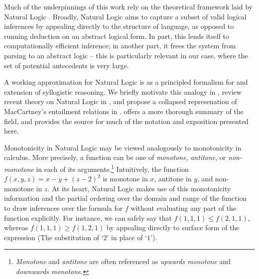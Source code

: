 Much of the underpinnings of this work rely on the theoretical framework
  laid by Natural Logic
  \cite{key:1986benthem-natlog,key:1991valencia-natlog}.
Broadly, Natural Logic aims to capture a subset of valid logical
  inferences by appealing directly to the structure of language,
  as opposed to running deduction on an abstract logical form.
In part, this lends itself to computationally efficient inference;
  in another part, it frees the system from parsing to an abstract
  logic -- this is particularly relevant in our case, where the set
  of potential antecedents is very large.

A working approximation for Natural Logic is as a principled formalism
  for and extension of syllogistic reasoning.
We briefly motivate this analogy in ,
  review recent theory on Natural Logic in
  , and propose a collapsed
  represenation of MacCartney's entailment relations in
  .
 offers a more thorough summary of the
  field, and provides the source for much of the notation and
  exposition presented here.

%
%


%
%
Monotonicity in Natural Logic may be viewed analogously to monotonicity
  in calculus.
More precisely, a function can be one of \textit{monotone},
  \textit{antitone}, or \textit{non-monotone} in each of its
  arguments.\footnote{
    \textit{Monotone} and \textit{antitone} are often referenced
    as \textit{upwards monotone} and \textit{downwards monotone}.
  }
Intuitively, the function $f(x,y,z) = x - y + (z-2)^2$ is
  monotone in $x$, antitone in $y$, and non-monotone in $z$.
At its heart, Natural Logic makes use of this monotonicity information
  and the partial ordering over the domain and range of the function
  to draw inferences over the formula for $f$ without evaluating
  any part of the function explicitly.
For instance, we can safely say that $f(1,1,1) \leq f(2,1,1)$, whereas
  $f(1,1,1) \geq f(1,2,1)$ by appealing directly to surface form of
  the expression (The substitution of `$2$' in place of `$1$').

